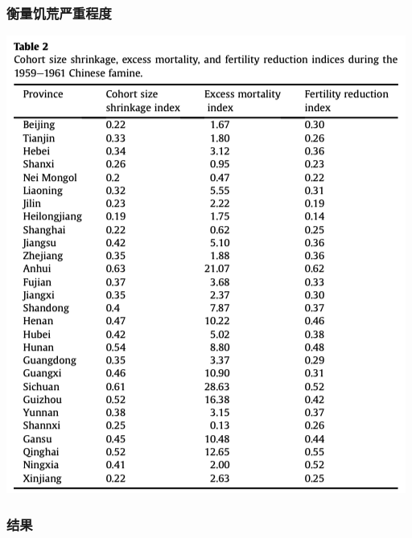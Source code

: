 \documentclass{beamer}
\begin{document}
\begin{frame}
\frametitle{衡量饥荒严重程度}
\includegraphics[scale=0.5]{table2}
	
\end{frame}

\begin{frame}
\frametitle{结果}
\end{frame}

\begin{frame}
\frametitle{}
	
\end{frame}

\begin{frame}
\frametitle{}
	
\end{frame}

\end{document}
